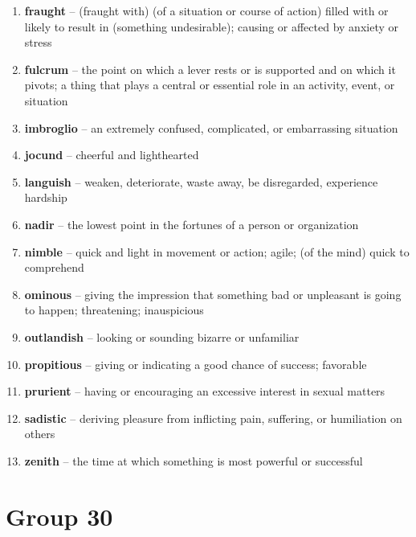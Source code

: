 \begin{enumerate}[wide,labelindent=0pt]
\item \textbf{fraught} -- (fraught with) (of a situation or course of action) filled with or likely to result in (something undesirable); causing or affected by anxiety or stress
\item \textbf{fulcrum} -- the point on which a lever rests or is supported and on which it pivots; a thing that plays a central or essential role in an activity, event, or situation
\item \textbf{imbroglio} -- an extremely confused, complicated, or embarrassing situation
\item \textbf{jocund} -- cheerful and lighthearted
\item \textbf{languish} -- weaken, deteriorate, waste away, be disregarded, experience hardship
\item \textbf{nadir} -- the lowest point in the fortunes of a person or organization
\item \textbf{nimble} -- quick and light in movement or action; agile; (of the mind) quick to comprehend
\item \textbf{ominous} -- giving the impression that something bad or unpleasant is going to happen; threatening; inauspicious
\item \textbf{outlandish} -- looking or sounding bizarre or unfamiliar
\item \textbf{propitious} -- giving or indicating a good chance of success; favorable
\item \textbf{prurient} -- having or encouraging an excessive interest in sexual matters
\item \textbf{sadistic} -- deriving pleasure from inflicting pain, suffering, or humiliation on others
\item \textbf{zenith} -- the time at which something is most powerful or successful
\end{enumerate}


\newpage
\section{Group 30}

